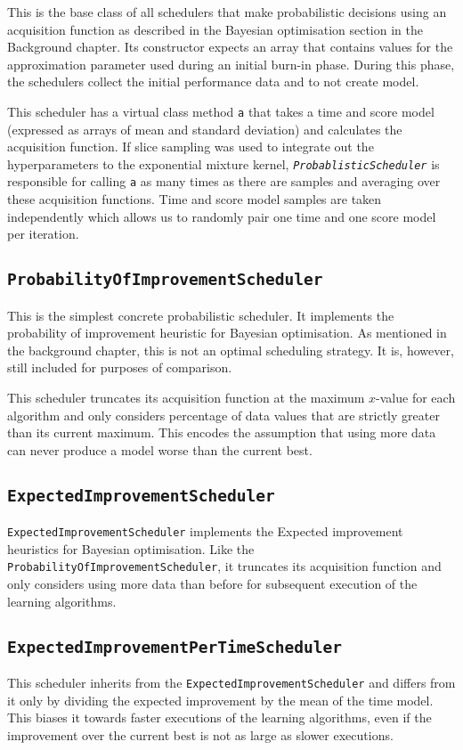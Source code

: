 \documentclass[a4paper,12pt,twoside,openright]{report}
\begin{document}
This is the base class of all schedulers that make probabilistic decisions using an acquisition function as described in the Bayesian optimisation section in the Background chapter. Its constructor expects an array that contains values for the approximation parameter used during an initial burn-in phase. During this phase, the schedulers collect the initial performance data and to not create model.

This scheduler has a virtual class method \texttt{a} that takes a time and score model (expressed as arrays of mean and standard deviation) and calculates the acquisition function. If slice sampling was used to integrate out the hyperparameters to the exponential mixture kernel, \texttt{\textit{ProbablisticScheduler}} is responsible for calling \texttt{a} as many times as there are samples and averaging over these acquisition functions. Time and score model samples are taken independently which allows us to randomly pair one time and one score model per iteration.

\subsection{\texttt{ProbabilityOfImprovementScheduler}}
This is the simplest concrete probabilistic scheduler. It implements the probability of improvement heuristic for Bayesian optimisation. As mentioned in the background chapter, this is not an optimal scheduling strategy. It is, however, still included for purposes of comparison.

This scheduler truncates its acquisition function at the maximum $x$-value for each algorithm and only considers percentage of data values that are strictly greater than its current maximum. This encodes the assumption that using more data can never produce a model worse than the current best.

\subsection{\texttt{ExpectedImprovementScheduler}}
\texttt{ExpectedImprovementScheduler} implements the Expected improvement heuristics for Bayesian optimisation. Like the \texttt{ProbabilityOfImprovementScheduler}, it truncates its acquisition function and only considers using more data than before for subsequent execution of the learning algorithms.

\subsection{\texttt{ExpectedImprovementPerTimeScheduler}}
This scheduler inherits from the \texttt{ExpectedImprovementScheduler} and differs from it only by dividing the expected improvement by the mean of the time model. This biases it towards faster executions of the learning algorithms, even if the improvement over the current best is not as large as slower executions.
\end{document}
